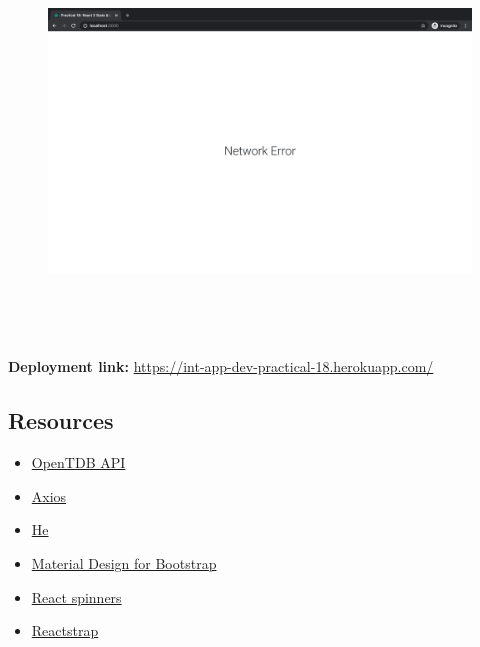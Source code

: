 \documentclass{article}
\begin{document}
\begin{figure}[H]
  \includegraphics[width=175mm, height=105mm]{./img/18-expected-opentdb-5.png}
\end{figure}

\textbf{Deployment link:} \href{https://int-app-dev-practical-18.herokuapp.com/}{https://int-app-dev-practical-18.herokuapp.com/} 

\subsection*{Resources} 
\begin{itemize}
  \item \href{https://opentdb.com/}{OpenTDB API}
  \item \href{https://www.npmjs.com/package/axios/}{Axios}
  \item \href{https://www.npmjs.com/package/he/}{He}
  \item \href{https://www.npmjs.com/package/mdbreact/}{Material Design for Bootstrap}
  \item \href{https://www.npmjs.com/package/react-spinners/}{React spinners}
  \item \href{https://www.npmjs.com/package/reactstrap/}{Reactstrap}
\end{itemize}
 
\end{document}

